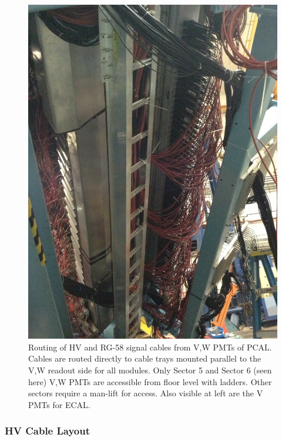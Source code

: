 \documentclass[letterpaper,10pt]{article}
\begin{document}
\begin{figure}[htbp]
  \centering
  \includegraphics[width= 5in, keepaspectratio = true]{pcal-installation-4.jpg}
  \vspace{2mm}
  \caption{Routing of HV and RG-58 signal cables from V,W PMTs of PCAL.  Cables are routed directly to
    cable trays mounted parallel to the V,W readout side for all modules. Only Sector 5 and Sector 6
    (seen here) V,W PMTs are accessible from floor level with ladders.  Other sectors require a man-lift for access.
     Also visible at left are the V PMTs for ECAL.}
\label{pcal-pmts-4}
\end{figure}


\subsubsection{HV Cable Layout}
\label{hv-layout}
\end{document}
